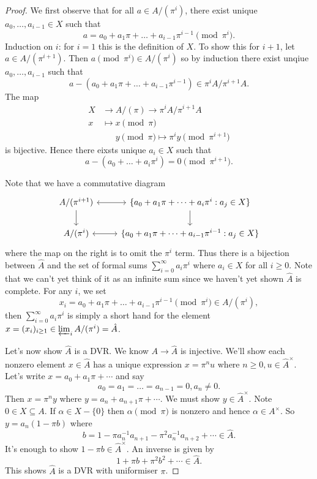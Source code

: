 \documentclass[a4paper]{article}
\begin{document}
\begin{proof}
  We first observe that for all \(a \in A/(\pi^i)\), there exist unique \(a_0, \dots, a_{i - 1} \in X\) such that
  \[
    a = a_0 + a_1 \pi + \dots + a_{i - 1} \pi^{i - 1} \pmod{\pi^i}.
  \]
  Induction on \(i\): for \(i = 1\) this is the definition of \(X\). To show this for \(i + 1\), let \(a \in A/(\pi^{i + 1})\). Then \(a \pmod{\pi^i} \in A/(\pi^i)\) so by induction there exist unqiue \(a_0, \dots, a_{i - 1}\) such that
  \[
    a - (a_0 + a_1 \pi + \dots + a_{i - 1} \pi^{i - 1}) \in \pi^i A/ \pi^{i + 1}A.
  \]
  The map
  \begin{align*}
    X &\to A/(\pi) \to \pi^iA/\pi^{i + 1}A \\
    x &\mapsto x \pmod \pi \\
    &\phantom{\to} y \pmod \pi \mapsto \pi^i y \pmod{\pi^{i + 1}}
  \end{align*}
  is bijective. Hence there eixsts unique \(a_i \in X\) such that
  \[
    a - (a_0 + \dots + a_i \pi^i) = 0 \pmod{\pi^{i + 1}}.
  \]

  Note that we have a commutative diagram
  \[
    \begin{tikzcd}
      A/(\pi^{i + 1}) \ar[r, leftrightarrow] \ar[d] & \{a_0 + a_1 \pi + \dots + a_i \pi^i: a_j \in X\} \ar[d] \\
      A/(\pi^i) \ar[r, leftrightarrow] & \{a_0 + a_1 \pi + \dots + a_{i - 1} \pi^{i - 1}: a_j \in X\}
    \end{tikzcd}
  \]
  where the map on the right is to omit the \(\pi^i\) term. Thus there is a bijection between \(\hat A\) and the set of formal sums \(\sum_{i = 0}^\infty a_i \pi^i\) where \(a_i \in X\) for all \(i \geq 0\). Note that we can't yet think of it as an infinite sum since we haven't yet shown \(\hat A\) is complete. For any \(i\), we set
  \[
    x_ i = a_0 + a_1\pi + \dots + a_{i - 1}\pi^{i - 1} \pmod{\pi^i} \in A/(\pi^i),
  \]
  then \(\sum_{i = 0}^\infty a_i\pi^i\) is simply a short hand for the element \(x = (x_i)_{i \geq 1} \in \varprojlim_i A/(\pi^i) = \hat A\).

  Let's now show \(\hat A\) is a DVR. We know \(A \to \hat A\) is injective. We'll show each nonzero element \(x \in \hat A\) has a unique expression \(x = \pi^n u\) where \(n \geq 0, u \in \hat A^\times\). Let's write \(x = a_0 + a_1 \pi + \cdots\) and say
  \[
    a_0 = a_1 = \dots = a_{n - 1} = 0, a_n \neq 0.
  \]
  Then \(x = \pi^n y\) where \(y = a_n + a_{n + 1} \pi + \cdots\). We must show \(y \in \hat A^\times\). Note \(0 \in X \subseteq A\). If \(\alpha \in X - \{0\}\) then \(\alpha \pmod \pi\) is nonzero and hence \(\alpha \in A^\times\). So \(y = a_n(1 - \pi b)\) where
  \[
    b = 1 - \pi a_n^{-1} a_{n + 1} - \pi^2 a_n^{-1} a_{n + 2} + \cdots \in \hat A.
  \]
  It's enough to show \(1 - \pi b \in \hat A^\times\). An inverse is given by
  \[
    1 + \pi b + \pi^2 b^2 + \cdots \in \hat A.
  \]
  This shows \(\hat A\) is a DVR with uniformiser \(\pi\).


\end{proof}
\end{document}
